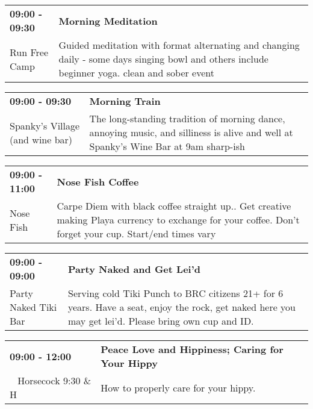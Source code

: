 \begin{tabular}{ p{1in} p{2.2in} }
    \textbf{09:00 - 09:30} & \textbf{Morning Meditation} \\
    Run Free Camp \newline  & Guided meditation with format alternating and changing daily - some days singing bowl and others include beginner yoga. clean and sober event \\
    \hline 
\end{tabular}
    
\begin{tabular}{ p{1in} p{2.2in} }
    \textbf{09:00 - 09:30} & \textbf{Morning Train} \\
    Spanky's Village (and wine bar) \newline  & The long-standing tradition of morning dance, annoying music, and silliness is alive and well at Spanky's Wine Bar at 9am sharp-ish \\
    \hline 
\end{tabular}
    
\begin{tabular}{ p{1in} p{2.2in} }
    \textbf{09:00 - 11:00} & \textbf{Nose Fish Coffee} \\
    Nose Fish \newline  & Carpe Diem with black coffee straight up.. Get creative making Playa currency to exchange for your coffee. Don't forget your cup. Start/end times vary \\
    \hline 
\end{tabular}
    
\begin{tabular}{ p{1in} p{2.2in} }
    \textbf{09:00 - 09:00} & \textbf{Party Naked and Get Lei'd} \\
    Party Naked Tiki Bar \newline  & Serving cold Tiki Punch to BRC citizens 21+ for 6 years. Have a seat, enjoy the rock, get naked here you may get lei'd. Please bring own cup and ID. \\
    \hline 
\end{tabular}
    
\begin{tabular}{ p{1in} p{2.2in} }
    \textbf{09:00 - 12:00} & \textbf{Peace Love and Hippiness; Caring for Your Hippy} \\
    ~ \newline Horsecock 9:30 \& H & How to properly care for your hippy. \\
    \hline 
\end{tabular}
    

